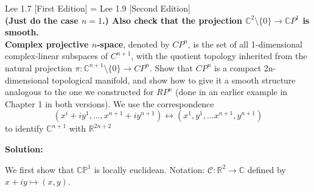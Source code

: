 \documentclass[12pt]{extarticle}
\newcommand{\C}{\mathbb{C}}
\newcommand{\R}{\mathbb{R}}
\newcommand{\CP}{\mathbb{CP}}
\begin{document}
\begin{enumerate}
Lee 1.7 [First Edition] = Lee 1.9 [Second Edition] \\

\textbf{  (Just do the case $n=1$.) Also check that the projection $\C^{2}\setminus\{0\}\to\C P^1$ is smooth.} \\ 

\textbf{ Complex projective $n$-space}, denoted by $CP^n$, is the set of all 1-dimensional complex-linear subspaces of $C^{n+1}$, with the quotient topology inherited from the natural projection  $\pi: \C^{n+1} \setminus \{ 0 \} \to CP^n$.  Show that $CP^n$ is a compact 2n-dimensional topological manifold, and show how to give it a smooth structure analogous to the one we constructed for $RP^n$ (done in an earlier example in Chapter 1 in both versions). We use the correspondence
 \[
(x^i + iy^1,...,x^{n+1}+iy^{n+1}) \leftrightarrow (x^1, y^1,... x^{n+1}, y^{n+1})
  \]
  to identify $\C^{n+1}$ with $\R^{2n+2}$
  
\textbf{Solution:}

We first show that $\CP^1$ is locally euclidean.
Notation: $\mathcal{C} : \R^2 \to \C$ defined by $x + iy \mapsto (x, y)$.


\end{enumerate}
\end{document}
